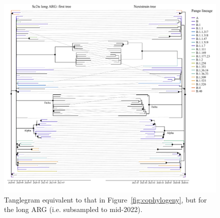 \documentclass{article}
\begin{document}
\begin{figure} \centering
\includegraphics[width=\textwidth]{figures/supp_cophylogeny_long.pdf}
\caption{\label{fig:cophylogeny_long}Tanglegram equivalent to that in Figure~\ref{fig:cophylogeny}, but for the long ARG (i.e. subsampled to mid-2022). }
\end{figure}
\end{document}
